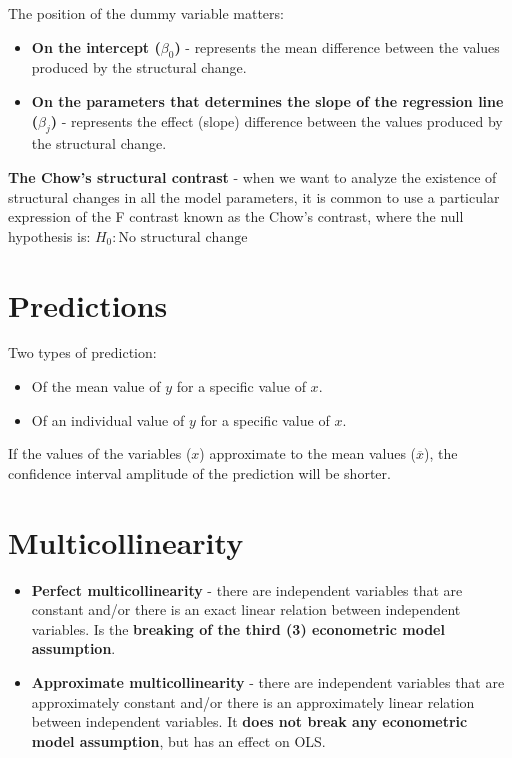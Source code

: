 \documentclass[10pt, a4paper, landscape]{extarticle}
\begin{document}
\begin{multicols}{3}
The position of the dummy variable matters:
\begin{itemize}[leftmargin=*]
\item \textbf{On the intercept ($\beta_0$)} - represents the mean difference between the values produced by the structural change.
\item \textbf{On the parameters that determines the slope of the regression line ($\beta_j$)} - represents the effect (slope) difference between the values produced by the structural change.
\end{itemize}

\textbf{The Chow's structural contrast} - when we want to analyze the existence of structural changes in all the model parameters, it is common to use a particular expression of the F contrast known as the Chow's contrast, where the null hypothesis is: $H_0: \text{No structural change}$

\section*{Predictions}

Two types of prediction:

\begin{itemize}[leftmargin=*]
\item Of the mean value of $y$ for a specific value of $x$.
\item Of an individual value of $y$ for a specific value of $x$.
\end{itemize}

If the values of the variables ($x$) approximate to the mean values ($\overline{x}$), the confidence interval amplitude of the prediction will be shorter. 

\columnbreak

\section*{Multicollinearity}

\begin{itemize}[leftmargin=*]
\item \textbf{Perfect multicollinearity} - there are independent variables that are constant and/or there is an exact linear relation between independent variables. Is the \textbf{breaking of the third (3) econometric model assumption}.
\item \textbf{Approximate multicollinearity} - there are independent variables that are approximately constant and/or there is an approximately linear relation between independent variables. It \textbf{does not break any econometric model assumption}, but has an effect on OLS.
\end{itemize}


\end{multicols}
\end{document}

